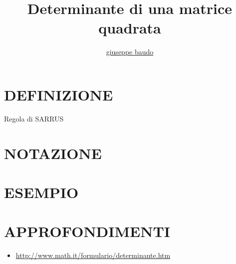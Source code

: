 \documentclass[a4paper,10pt]{article}
\title{Determinante di una matrice quadrata}
\author{\href{http://www.baudo.hol.es}{giuseppe baudo}}
\begin{document}
\maketitle

\section{DEFINIZIONE}
Regola di SARRUS

\section{NOTAZIONE}

\section{ESEMPIO}

\section{APPROFONDIMENTI}
\begin{itemize}
 \item \url{http://www.math.it/formulario/determinante.htm}
\end{itemize}
\end{document}
